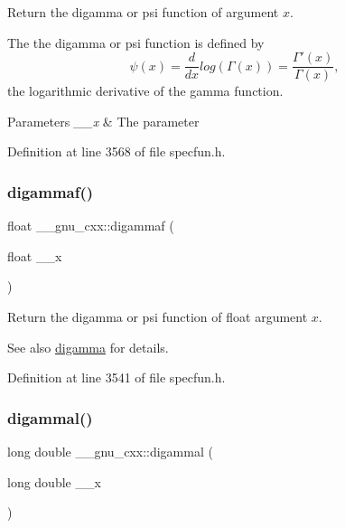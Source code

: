 Return the digamma or psi function of argument $ x $.

The the digamma or psi function is defined by \[ \psi(x) = \frac{d}{dx}log\left(\Gamma(x)\right) = \frac{\Gamma'(x)}{\Gamma(x)}, \] the logarithmic derivative of the gamma function.


\begin{DoxyParams}{Parameters}
{\em \+\_\+\+\_\+x} & The parameter \\
\hline
\end{DoxyParams}


Definition at line 3568 of file specfun.\+h.

\mbox{\label{group__gnu__math__spec__func_ga65b58ffe1d02ccda1113539b62d87b94}} 
\subsubsection{\texorpdfstring{digammaf()}{digammaf()}}
{\footnotesize\ttfamily float \+\_\+\+\_\+gnu\+\_\+cxx\+::digammaf (\begin{DoxyParamCaption}\item[{float}]{\+\_\+\+\_\+x }\end{DoxyParamCaption})\hspace{0.3cm}{\ttfamily [inline]}}

Return the digamma or psi function of {\ttfamily float} argument $ x $.

\begin{DoxySeeAlso}{See also}
\hyperlink{group__gnu__math__spec__func_ga7b87300edf8754d959e1d94fe0c9246e}{digamma} for details. 
\end{DoxySeeAlso}


Definition at line 3541 of file specfun.\+h.

\mbox{\label{group__gnu__math__spec__func_gaaa1bf1503709175915cb81bcd4355ccf}} 
\subsubsection{\texorpdfstring{digammal()}{digammal()}}
{\footnotesize\ttfamily long double \+\_\+\+\_\+gnu\+\_\+cxx\+::digammal (\begin{DoxyParamCaption}\item[{long double}]{\+\_\+\+\_\+x }\end{DoxyParamCaption})\hspace{0.3cm}{\ttfamily [inline]}}

